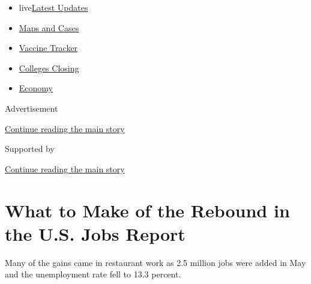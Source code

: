\begin{itemize}
\tightlist
\item
  live\href{https://www.nytimes3xbfgragh.onion/2020/08/20/world/coronavirus-covid.html?name=styln-coronavirus-markets\&region=TOP_BANNER\&variant=undefined\&block=storyline_menu_recirc\&action=click\&pgtype=Article\&impression_id=2b343a21-e385-11ea-b0af-051312a80ef8}{Latest
  Updates}
\item
  \href{https://www.nytimes3xbfgragh.onion/interactive/2020/us/coronavirus-us-cases.html?name=styln-coronavirus-markets\&region=TOP_BANNER\&variant=undefined\&block=storyline_menu_recirc\&action=click\&pgtype=Article\&impression_id=2b346130-e385-11ea-b0af-051312a80ef8}{Maps
  and Cases}
\item
  \href{https://www.nytimes3xbfgragh.onion/interactive/2020/science/coronavirus-vaccine-tracker.html?name=styln-coronavirus-markets\&region=TOP_BANNER\&variant=undefined\&block=storyline_menu_recirc\&action=click\&pgtype=Article\&impression_id=2b346131-e385-11ea-b0af-051312a80ef8}{Vaccine
  Tracker}
\item
  \href{https://www.nytimes3xbfgragh.onion/2020/08/19/us/colleges-closing-covid.html?name=styln-coronavirus-markets\&region=TOP_BANNER\&variant=undefined\&block=storyline_menu_recirc\&action=click\&pgtype=Article\&impression_id=2b346132-e385-11ea-b0af-051312a80ef8}{Colleges
  Closing}
\item
  \href{https://www.nytimes3xbfgragh.onion/live/2020/08/20/business/stock-market-today-coronavirus?name=styln-coronavirus-markets\&region=TOP_BANNER\&variant=undefined\&block=storyline_menu_recirc\&action=click\&pgtype=Article\&impression_id=2b346133-e385-11ea-b0af-051312a80ef8}{Economy}
\end{itemize}

Advertisement

\protect\hyperlink{after-top}{Continue reading the main story}

Supported by

\protect\hyperlink{after-sponsor}{Continue reading the main story}

\hypertarget{what-to-make-of-the-rebound-in-the-us-jobs-report}{%
\section{What to Make of the Rebound in the U.S. Jobs
Report}\label{what-to-make-of-the-rebound-in-the-us-jobs-report}}

Many of the gains came in restaurant work as 2.5 million jobs were added
in May and the unemployment rate fell to 13.3 percent.

